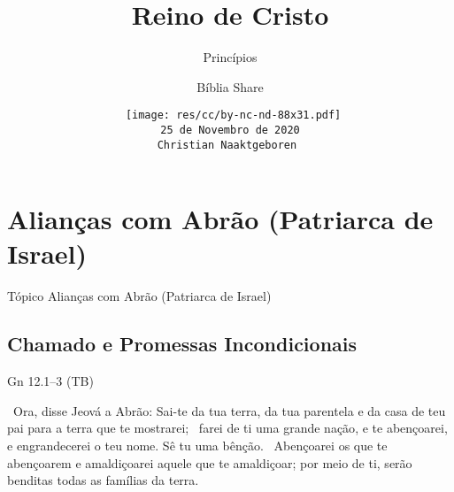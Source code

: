 \documentclass[12pt,aspectratio=169]{beamer}
\title[Reino de Cristo -- Princípios]{Reino de Cristo}
\subtitle{Princípios}
\author{Bíblia Share}
\date[{\tiny\tt 25 de Novembro de 2020}]{{\scriptsize\tt%
    \texttt{[image: res/cc/by-nc-nd-88x31.pdf]}\\[\smallskipamount]
    25 de Novembro de 2020\\
    Christian Naaktgeboren
}}
\newcommand{\ver}[1]{%
    \raisebox{0.50ex}{%
        \scalebox{1.1}{%
            \pmb{\textbf{\textcolor{BSpbg}{#1}}}%
        }%
    }%
}
\newcommand{\QUOTE}[1]{%
    \par\noindent\hspace*{0.05\linewidth}%
    \begin{minipage}{0.9\linewidth}%
        \linespread{1.35}\large{#1}%
    \end{minipage}%
}
\newcommand{\RED}[1]{{\textcolor{TXred}{#1}}}
\newcommand{\YEL}[1]{{\textcolor{TXyel}{#1}}}
\newcommand{\GRE}[1]{{\textcolor{TXgre}{#1}}}
\newcommand{\CYA}[1]{{\textcolor{TXcya}{#1}}}
\newcommand{\BLU}[1]{{\textcolor{TXblu}{#1}}}
\newcommand{\MAG}[1]{{\textcolor{TXmag}{#1}}}
\newcommand{\BRI}[1]{{\textcolor{BSpbg}{#1}}}   %
\begin{document}
\begin{frame}
    \titlepage
\end{frame}
\section{Alianças com Abrão (Patriarca de Israel)}

    \begin{frame}
        \par\noindent\hspace*{0.05\linewidth}%
        \begin{minipage}{0.9\linewidth}%
            \large%
            \begin{alertblock}{Tópico}
                Alianças com Abrão (Patriarca de Israel)
            \end{alertblock}
        \end{minipage}%
    \end{frame}

    \subsection{Chamado e Promessas \BRI{Incondicionais}}

    \begin{frame}{Gn 12.1--3 (TB)}
        \QUOTE{%
            \ver{1}~Ora, disse Jeová a Abrão: Sai-te da tua terra, da tua parentela e da casa de
            teu pai para a terra que te mostrarei;
            \ver{2}~farei de ti uma \YEL{grande nação}, e te \GRE{abençoarei}, e
            \CYA{engrandecerei} o teu nome.  \GRE{Sê tu uma bênção}.
            \ver{3}~\BLU{Abençoarei os que te abençoarem} e \RED{amaldiçoarei aquele que te
            amaldiçoar}; por meio de ti, serão \MAG{benditas todas as famílias da terra}.
        }
    \end{frame}
\end{document}
